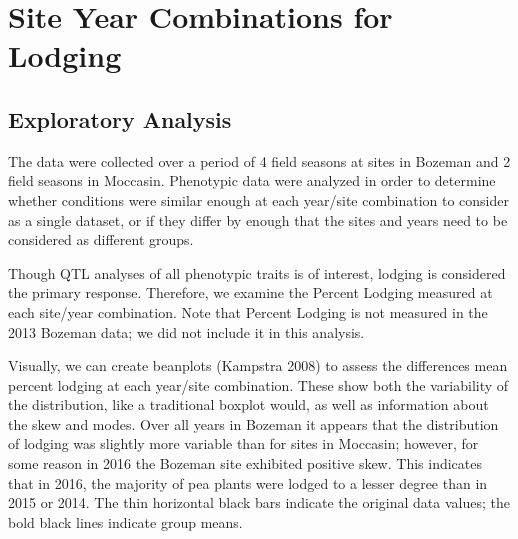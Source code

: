 \documentclass[11pt]{article}
\begin{document}
\section{Site Year Combinations for Lodging}




\subsection{Exploratory Analysis} 
The data were collected over a period of 4 field seasons at sites in Bozeman and 2 field seasons in Moccasin. Phenotypic data were analyzed in order to determine whether conditions were similar enough at each year/site combination to consider as a single dataset, or if they differ by enough that the sites and years need to be considered as different groups.  

Though QTL analyses of all phenotypic traits is of interest, lodging is considered the primary response. Therefore, we examine the Percent Lodging measured at each site/year combination. Note that Percent Lodging is not measured in the 2013 Bozeman data; we did not include it in this analysis.

Visually, we can create beanplots (Kampstra 2008) to assess the differences mean percent lodging at each year/site combination.  These show both the variability of the distribution, like a traditional boxplot would, as well as information about the skew and modes. Over all years in Bozeman it appears that the distribution of lodging was slightly more variable than for sites in Moccasin; however, for some reason in 2016 the Bozeman site exhibited positive skew.  This indicates that in 2016, the majority of pea plants were lodged to a lesser degree than in 2015 or 2014.  The thin horizontal black bars indicate the original data values; the bold black lines indicate group means. 


\begin{knitrout}\footnotesize
{}\color{fgcolor}\begin{kframe}


{\ttfamily\noindent\bfseries{}}\end{kframe}
\end{knitrout}
\end{document}
